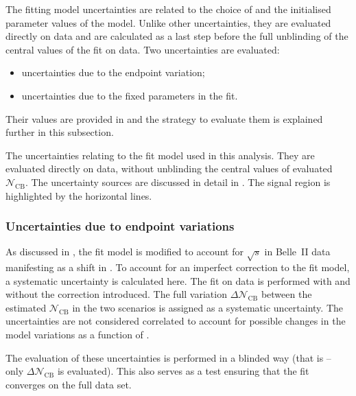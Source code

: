 The \Mbc fitting model uncertainties are related to the choice of  
and the initialised parameter values of the model.
Unlike other uncertainties, they are evaluated directly on data and are calculated as a last step
before the full unblinding of the central values of the \Mbc fit on data.
Two uncertainties are evaluated:
\begin{itemize}
    \item uncertainties due to the \Mbc endpoint variation;
    \item uncertainties due to the fixed parameters in the \Mbc fit.
\end{itemize}
Their values are provided in  and the strategy to evaluate them is explained further in this subsection.

\begin{table}[htbp!]
    \centering
    \caption{\label{tab:fit_uncertainties} 
    The uncertainties relating to the \Mbc fit model used in this analysis.
    They are evaluated directly on data, without unblinding the central values of evaluated $\mathcal{N}_{\mathrm{CB}}$.
    The uncertainty sources are discussed in detail in .
    The signal region is highlighted by the horizontal lines.
    }
    
\end{table}

\subsubsection{Uncertainties due to \texorpdfstring{\Mbc}{Mbc} endpoint variations}\label{sec:fit_endpoint_systematic}

As discussed in , the fit model is modified to account for $\sqrt{s}$ in Belle~II data manifesting as a shift in \Mbc.
To account for an imperfect correction to the fit model, a systematic uncertainty is calculated here.
The fit on data is performed with and without the \Mbc correction introduced.
The full variation $\Delta\mathcal{N}_{\mathrm{CB}}$ between the estimated $\mathcal{N}_{\mathrm{CB}}$ in the two scenarios is assigned as a systematic uncertainty.
The uncertainties are not considered correlated to account for possible changes in the model variations as a function of \EB.

The evaluation of these uncertainties is performed in a blinded way (that is -- only $\Delta\mathcal{N}_{\mathrm{CB}}$  is evaluated).
This also serves as a test ensuring that the fit converges on the full data set.

